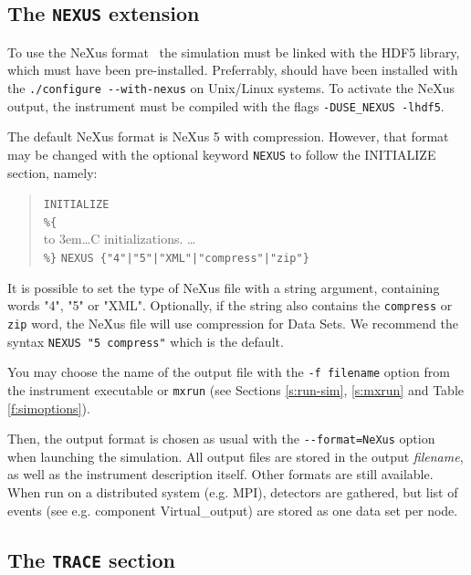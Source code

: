 \subsection{The \texttt{NEXUS} extension}
   
\label{s:nexus}

To use the NeXus format~\cite{nexus_webpage} the simulation must be linked with the HDF5 library, which must have been pre-installed. Preferrably, \MCX should
have been installed with the \verb+./configure --with-nexus+ on Unix/Linux systems. To activate the NeXus output, the instrument must be compiled with the flags
\verb+-DUSE_NEXUS -lhdf5+.

The default NeXus format is NeXus 5 with compression. However, that format may be changed with the optional keyword \verb+NEXUS+ to follow the INITIALIZE section, namely:

\begin{quote}
  \texttt{INITIALIZE} \\
  \verb|%{| \\
  \hbox to 3em{}\ldots C initializations. \ldots \\
  \verb|%}|
  \verb+NEXUS {"4"|"5"|"XML"|"compress"|"zip"}+
\end{quote}

It is possible to set the type of NeXus file with a string argument, containing words "4", "5" or "XML". Optionally, if the string also contains the \verb+compress+ or \verb+zip+
word, the NeXus file will use compression for Data Sets. We recommend the syntax \verb+NEXUS "5 compress"+ which is the default.

You may choose the name of the output file with the \verb+-f filename+ option from the instrument executable or \verb+mxrun+ (see Sections \ref{s:run-sim}, \ref{s:mxrun} and Table
\ref{f:simoptions}).

Then, the output format is chosen as usual with the \verb+--format=NeXus+ option when launching the simulation. All output files are stored in the output \textit{filename}, as well
as the instrument description itself. Other formats are still available. When run on a distributed system (e.g. MPI), detectors are gathered, but list of events (see e.g. component
Virtual\_output) are stored as one data set per node.

\subsection{The \texttt{TRACE} section}
\label{s:trace}


